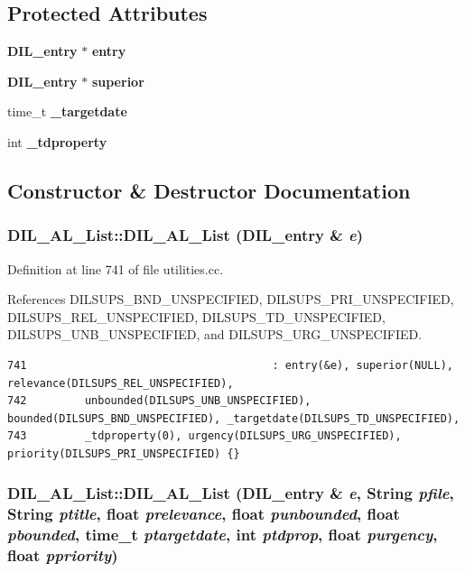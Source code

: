 \subsection*{Protected Attributes}
\begin{CompactItemize}
\item 
{\bf DIL\_\-entry} $\ast$ {\bf entry}
\item 
{\bf DIL\_\-entry} $\ast$ {\bf superior}
\item 
time\_\-t {\bf \_\-targetdate}
\item 
int {\bf \_\-tdproperty}
\end{CompactItemize}


\subsection{Constructor \& Destructor Documentation}
\subsubsection{\setlength{\rightskip}{0pt plus 5cm}DIL\_\-AL\_\-List::DIL\_\-AL\_\-List ({\bf DIL\_\-entry} \& {\em e})}\label{classDIL__AL__List_a0}




Definition at line 741 of file utilities.cc.

References DILSUPS\_\-BND\_\-UNSPECIFIED, DILSUPS\_\-PRI\_\-UNSPECIFIED, DILSUPS\_\-REL\_\-UNSPECIFIED, DILSUPS\_\-TD\_\-UNSPECIFIED, DILSUPS\_\-UNB\_\-UNSPECIFIED, and DILSUPS\_\-URG\_\-UNSPECIFIED.



\footnotesize\begin{verbatim}741                                      : entry(&e), superior(NULL), relevance(DILSUPS_REL_UNSPECIFIED),
742         unbounded(DILSUPS_UNB_UNSPECIFIED), bounded(DILSUPS_BND_UNSPECIFIED), _targetdate(DILSUPS_TD_UNSPECIFIED),
743         _tdproperty(0), urgency(DILSUPS_URG_UNSPECIFIED), priority(DILSUPS_PRI_UNSPECIFIED) {}
\end{verbatim}\normalsize 
{}
\subsubsection{\setlength{\rightskip}{0pt plus 5cm}DIL\_\-AL\_\-List::DIL\_\-AL\_\-List ({\bf DIL\_\-entry} \& {\em e}, {\bf String} {\em pfile}, {\bf String} {\em ptitle}, float {\em prelevance}, float {\em punbounded}, float {\em pbounded}, time\_\-t {\em ptargetdate}, int {\em ptdprop}, float {\em purgency}, float {\em ppriority})}\label{classDIL__AL__List_a1}




